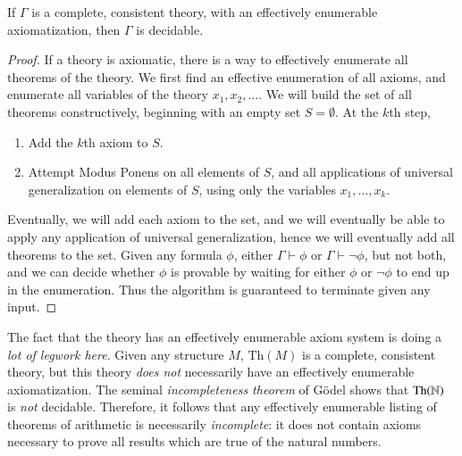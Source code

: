 \begin{theorem}
    If $\Gamma$ is a complete, consistent theory, with an effectively enumerable axiomatization, then $\Gamma$ is decidable.
\end{theorem}
\begin{proof}
    If a theory is axiomatic, there is a way to effectively enumerate all theorems of the theory. We first find an effective enumeration of all axioms, and enumerate all variables of the theory $x_1, x_2, \dots$. We will build the set of all theorems constructively, beginning with an empty set $S = \emptyset$. At the $k$th step,
    \begin{enumerate}
        \item Add the $k$th axiom to $S$.
        \item Attempt Modus Ponens on all elements of $S$, and all applications of universal generalization on elements of $S$, using only the variables $x_1, \dots, x_k$.
    \end{enumerate}
    Eventually, we will add each axiom to the set, and we will eventually be able to apply any application of universal generalization, hence we will eventually add all theorems to the set. Given any formula $\phi$, either $\Gamma \vdash \phi$ or $\Gamma \vdash \neg \phi$, but not both, and we can decide whether $\phi$ is provable by waiting for either $\phi$ or $\neg \phi$ to end up in the enumeration. Thus the algorithm is guaranteed to terminate given any input.
\end{proof}

The fact that the theory has an effectively enumerable axiom system is doing a \emph{lot of legwork here}. Given any structure $M$, $\text{Th}(M)$ is a complete, consistent theory, but this theory \emph{does not} necessarily have an effectively enumerable axiomatization. The seminal \emph{incompleteness theorem} of G\"{o}del shows that $\text{Th}(\operatorname{\mathbb{N}})$ is \emph{not} decidable. Therefore, it follows that any effectively enumerable listing of theorems of arithmetic is necessarily \emph{incomplete}: it does not contain axioms necessary to prove all results which are true of the natural numbers.


